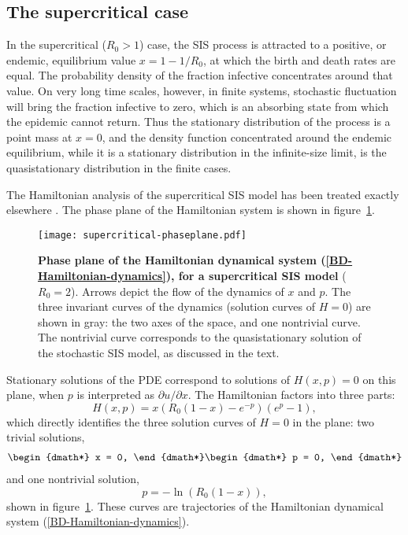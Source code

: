 \documentclass[review]{elsarticle}
\begin{document}
\subsection{The supercritical case}

In the supercritical ($R_0>1$) case, the SIS process is attracted to
a positive, or endemic, equilibrium value $x=1-1/R_0$, at which the birth and
death rates are equal.
The probability density of the fraction infective concentrates around
that value.
On very long time scales, however, in finite systems,
stochastic fluctuation will bring the
fraction infective to zero, which is an absorbing state from which
the epidemic cannot return.
Thus the stationary distribution of the process is a point mass at
$x=0$,
and the density function concentrated around the endemic equilibrium,
while it is a stationary distribution in the infinite-size limit,
is the quasistationary distribution in the finite cases.

The Hamiltonian analysis of the supercritical SIS model
has been treated exactly elsewhere
\cite{schwartz_converging_2011,forgoston2011maximal}.
The phase plane of the Hamiltonian system is
shown in figure~\ref{fig:super-plane}.

\begin{figure}
\centering
\texttt{[image: supercritical-phaseplane.pdf]}
\caption{\label{fig:super-plane}
{\bf Phase plane of the Hamiltonian dynamical system (\ref{BD-Hamiltonian-dynamics}),
for a supercritical SIS model} ($R_0=2$).
Arrows depict the flow of the dynamics of $x$ and $p$.
The three invariant curves of the dynamics
(solution curves of $H=0$) are shown in gray:
the two axes of the space, and one nontrivial curve.
The nontrivial curve corresponds to the quasistationary
solution of the stochastic SIS model, as discussed in the text.
}
\end{figure}

Stationary solutions of the PDE correspond to solutions of $H(x,p)=0$
on this plane, when $p$ is interpreted as
${\partial u}/{\partial x}$.
The Hamiltonian factors into three parts:
\begin{dmath*}
H(x,p) = x(R_0(1-x) - e^{-p})(e^p-1),
\end{dmath*}
which directly identifies the three solution curves
of $H=0$ in the plane:
two trivial solutions,
\begin{dgroup*}
\begin{dmath*}
x = 0,
\end{dmath*}\begin{dmath*}
p = 0,
\end{dmath*}
\end{dgroup*}
and one nontrivial solution,
\begin{dmath} \label{eqn:SIS-curve}
p = -\ln( R_0 (1-x) ),
\end{dmath}
shown in figure~\ref{fig:super-plane}.
These curves are trajectories of the Hamiltonian dynamical system
(\ref{BD-Hamiltonian-dynamics}).
\end{document}
